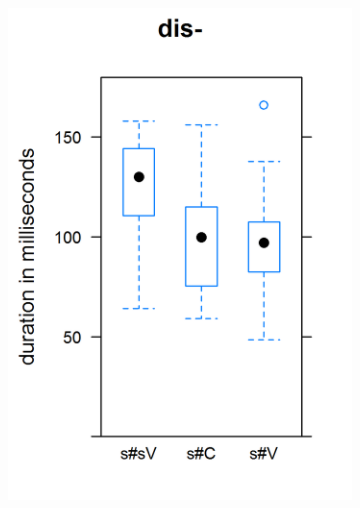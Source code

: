 \begin{figure}[t!]
\begin{center}
		\begin{subfigure}
			\centering
			\includegraphics[scale=.55]{images/Corpus/boxDis.png}
		\end{subfigure}
		~
		\begin{subfigure}
			\centering

\end{subfigure}
\end{center}
\end{figure}
